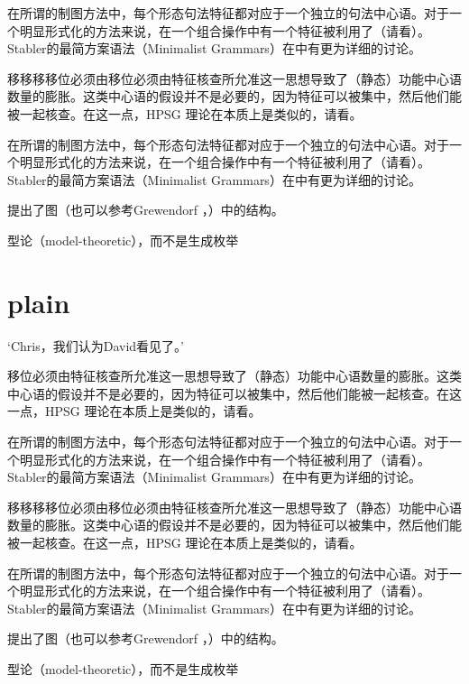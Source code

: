 \documentclass{scrbook}
\let\citew\citealp
\newcommand{\page}{}
\begin{document}
在所谓的制图方法中，每个形态句法特征都对应于一个独立的句法中心语\citep[\page 54, 61]{CR2010a}。对于一个明显形式化的方法来说，在一个组合操作中有一个特征被利用了（请看\citew[\page 335]{Stabler2001a}）。Stabler的最简方案语法（Minimalist Grammars）在中有更为详细的讨论。

移移移移位必须由移位必须由特征核查所允准这一思想导致了（静态）功能中心语数量的膨胀。这类中心语的假设并不是必要的，因为特征可以被集中，然后他们能被一起核查。在这一点，HPSG 理论在本质上是类似的，请看\citew[\S~II.3.3.4, \S~II.4.2]{Sternefeld2006a-u}。

在所谓的制图方法中，每个形态句法特征都对应于一个独立的句法中心语\citep[\page 54, 61]{CR2010a}。对于一个明显形式化的方法来说，在一个组合操作中有一个特征被利用了（请看\citew[\page 335]{Stabler2001a}）。Stabler的最简方案语法（Minimalist Grammars）在中有更为详细的讨论。

\citet[\page 297]{Rizzi97a-u}提出了图（也可以参考Grewendorf \citeyear[\page 85, 240]{Grewendorf2002a}，\citeyear{Grewendorf2009a}）中的结构。

型论（model-theoretic），而不是生成枚举

              
\section{plain}


    `Chris，我们认为David看见了。'

移位必须由特征核查所允准这一思想导致了（静态）功能中心语数量的膨胀。这类中心语的假设并不是必要的，因为特征可以被集中，然后他们能被一起核查。在这一点，HPSG 理论在本质上是类似的，请看\citew[\S~II.3.3.4, \S~II.4.2]{Sternefeld2006a-u}。

在所谓的制图方法中，每个形态句法特征都对应于一个独立的句法中心语\citep[\page 54, 61]{CR2010a}。对于一个明显形式化的方法来说，在一个组合操作中有一个特征被利用了（请看\citew[\page 335]{Stabler2001a}）。Stabler的最简方案语法（Minimalist Grammars）在中有更为详细的讨论。

移移移移位必须由移位必须由特征核查所允准这一思想导致了（静态）功能中心语数量的膨胀。这类中心语的假设并不是必要的，因为特征可以被集中，然后他们能被一起核查。在这一点，HPSG 理论在本质上是类似的，请看\citew[\S~II.3.3.4, \S~II.4.2]{Sternefeld2006a-u}。

在所谓的制图方法中，每个形态句法特征都对应于一个独立的句法中心语\citep[\page 54, 61]{CR2010a}。对于一个明显形式化的方法来说，在一个组合操作中有一个特征被利用了（请看\citew[\page 335]{Stabler2001a}）。Stabler的最简方案语法（Minimalist Grammars）在中有更为详细的讨论。

\citet[\page 297]{Rizzi97a-u}提出了图（也可以参考Grewendorf \citeyear[\page 85, 240]{Grewendorf2002a}，\citeyear{Grewendorf2009a}）中的结构。

型论（model-theoretic），而不是生成枚举


 


    
\end{document}
